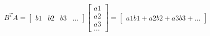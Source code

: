 $$B^TA = 
\begin{bmatrix} 
  b1 & b2 & b3 & ...  
\end{bmatrix}
\begin{bmatrix}
  a1 \\ 
  a2 \\ 
  a3 \\ 
  ... 
\end{bmatrix}
= 
\begin{bmatrix}
  a1b1 + a2b2 + a3b3 + ...
\end{bmatrix}
$$